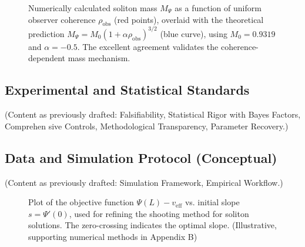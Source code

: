 \documentclass{report}
\begin{document}
    \begin{figure}[h!]
    \centering
    \caption{Numerically calculated soliton mass $M_{\Psi}$ as a function of uniform observer coherence $\rho_{\text{obs}}$ (red points), overlaid with the theoretical prediction $M_{\Psi} = M_0(1 + \alpha\rho_{\text{obs}})^{3/2}$ (blue curve), using $M_0 = 0.9319$ and $\alpha = -0.5$. The excellent agreement validates the coherence-dependent mass mechanism.}
    \label{fig:soliton_mass_plot}
    \end{figure}

    \subsection{Experimental and Statistical Standards}
    \label{subsec:experimental_statistical_standards}
    (Content as previously drafted: Falsifiability, Statistical Rigor with Bayes Factors, Comprehen sive Controls, Methodological Transparency, Parameter Recovery.)

    \subsection{Data and Simulation Protocol (Conceptual)}
    \label{subsec:data_simulation_protocol}
    (Content as previously drafted: Simulation Framework, Empirical Workflow.)
    
    \begin{figure}[h!]
    \centering
    \caption{Plot of the objective function $\Psi(L) - v_{\text{eff}}$ vs. initial slope $s = \Psi'(0)$, used for refining the shooting method for soliton solutions. The zero-crossing indicates the optimal slope. (Illustrative, supporting numerical methods in Appendix B)}
    \label{fig:objective_function_plot}
    \end{figure}
\end{document}
